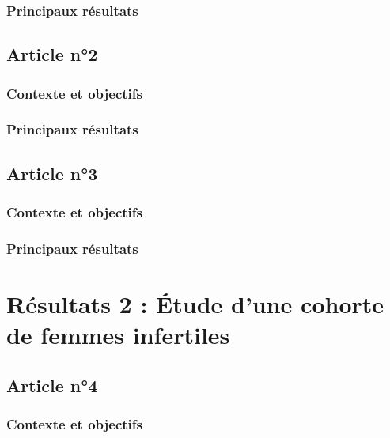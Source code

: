 \documentclass[12pt,a4paper,twoside]{ugathesis}
\begin{document}
\subsubsection{Principaux résultats}\label{principaux-resultats}

\subsection{Article n°2}\label{article-n2}

\subsubsection{Contexte et objectifs}\label{contexte-et-objectifs-1}

\subsubsection{Principaux résultats}\label{principaux-resultats-1}

\subsection{Article n°3}\label{article-n3}

\subsubsection{Contexte et objectifs}\label{contexte-et-objectifs-2}

\subsubsection{Principaux résultats}\label{principaux-resultats-2}

\section{Résultats 2 : Étude d'une cohorte de femmes
infertiles}\label{resultats-2-etude-dune-cohorte-de-femmes-infertiles}

\subsection{Article n°4}\label{article-n4}

\subsubsection{Contexte et objectifs}\label{contexte-et-objectifs-3}
\end{document}
